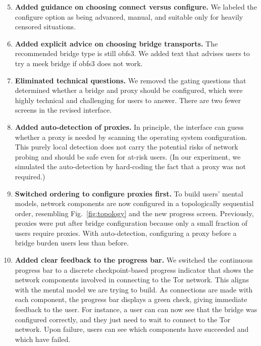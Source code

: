 \documentclass[USenglish,oneside,twocolumn]{article}
\begin{document}
\begin{enumerate}
\setcounter{enumi}{4}
\item {\bfseries Added guidance on choosing connect versus configure.} We labeled the configure option as being advanced, manual, and suitable only for heavily censored situations. 
\item {\bfseries Added explicit advice on choosing bridge transports.} The recommended bridge type is still obfs3. We added text that advises users to try a meek bridge if obfs3 does not work. 

\item {\bfseries Eliminated technical questions.}  We removed the gating questions that determined whether a bridge and proxy should be configured, which were highly technical and challenging for users to answer. There are two fewer screens in the revised interface.
\item {\bfseries Added auto-detection of proxies.} In principle, the interface can guess whether a proxy is needed by scanning the operating system configuration. This purely local detection does not carry the potential risks of network probing and should be safe even for at-risk users. (In our experiment, we simulated the auto-detection by hard-coding the fact that a proxy was not required.)

\item {\bfseries Switched ordering to configure proxies first.} To build users' mental models, network components are now configured in a topologically sequential order, resembling Fig.~\ref{fig:topology} and the new progress screen. Previously, proxies were put after bridge configuration because only a small fraction of users require proxies. With auto-detection, configuring a proxy before a bridge burden users less than before.
\item {\bfseries Added clear feedback to the progress bar.} We switched the continuous progress bar to a discrete checkpoint-based progress indicator that shows the network components involved in connecting to the Tor network. This aligns with the mental model we are trying to build. As connections are made with each component, the progress bar displays a green check, giving immediate feedback to the user. For instance, a user can can now see that the bridge was configured correctly, and they just need to wait to connect to the Tor network. Upon failure, users can see which components have succeeded and which have failed.
\end{enumerate}
\end{document}
